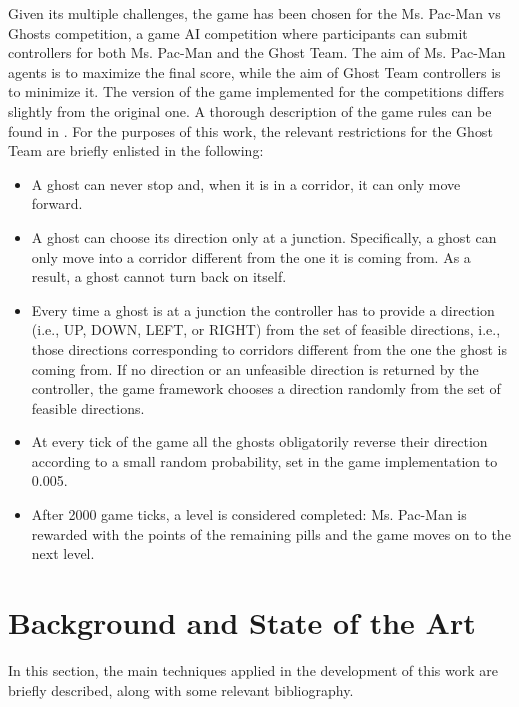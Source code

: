 \documentclass{llncs}
\begin{document}
Given its multiple challenges, the game has been chosen for the Ms. Pac-Man vs Ghosts competition, a game AI competition where participants can submit controllers for both Ms. Pac-Man and the Ghost Team. The aim of Ms. Pac-Man agents is to maximize the final score, while the aim of Ghost Team controllers is to minimize it. The version of the game implemented for the competitions differs slightly from the original one. A thorough description of the game rules can be found in \cite{MsPacManVSGhost2011}. For the purposes of this work, the relevant restrictions for the Ghost Team are briefly enlisted in the following:
\begin{itemize}
  \item A ghost can never stop and, when it is in a corridor, it can only move forward.
  \item A ghost can choose its direction only at a junction. Specifically, a ghost can only move into a corridor different from the one it is coming from. As a result, a ghost cannot turn back on itself.
  \item Every time a ghost is at a junction the controller has to provide a direction (i.e., UP, DOWN, LEFT, or RIGHT) from the set of feasible directions, i.e., those directions corresponding to corridors different from the one the ghost is coming from. If no direction or an unfeasible direction is returned by the controller, the game framework chooses a direction randomly from the set of feasible directions.
  \item At every tick of the game all the ghosts obligatorily reverse their direction according to a small random probability, set in the game implementation to 0.005.
  \item After 2000 game ticks, a level is considered completed: Ms. Pac-Man is rewarded with the points of the remaining pills and the game moves on to the next level.
\end{itemize}

%
%
\section{Background and State of the Art}
\label{sec:preliminaryconcepts_sota}

In this section, the main techniques applied in the development of this work are briefly described, along with some relevant bibliography.
\end{document}
